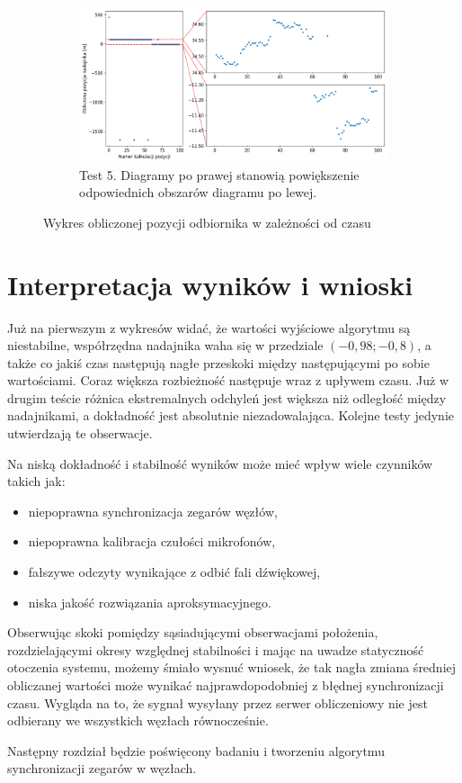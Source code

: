\begin{figure}[H]
    \ContinuedFloat\centering
    \begin{subfigure}{\textwidth}\label{fig:position_4}
        \centering
        \includegraphics[width=0.95\linewidth]{pics/position/position_4.png}
        \caption{Test 5. Diagramy po prawej stanowią powiększenie odpowiednich obszarów diagramu po lewej.}
    \end{subfigure}
    \caption{Wykres obliczonej pozycji odbiornika w zależności od czasu}
    \label{fig:position}
\end{figure}

\section{Interpretacja wyników i wnioski}

Już na pierwszym z wykresów widać, że wartości wyjściowe algorytmu są niestabilne, współrzędna nadajnika waha się w przedziale $(-0,98; -0,8)$, a także co jakiś czas następują nagłe przeskoki między następującymi po sobie wartościami. Coraz większa rozbieżność następuje wraz z upływem czasu. Już w drugim teście różnica ekstremalnych odchyleń jest większa niż odległość między nadajnikami, a dokładność jest absolutnie niezadowalająca. Kolejne testy jedynie utwierdzają te obserwacje.

Na niską dokładność i stabilność wyników może mieć wpływ wiele czynników takich jak:

\begin{itemize}
    \item niepoprawna synchronizacja zegarów węzłów,
    \item niepoprawna kalibracja czułości mikrofonów,
    \item fałszywe odczyty wynikające z odbić fali dźwiękowej,
    \item niska jakość rozwiązania aproksymacyjnego.
\end{itemize}

Obserwując skoki pomiędzy sąsiadującymi obserwacjami położenia, rozdzielającymi okresy względnej stabilności i mając na uwadze statyczność otoczenia systemu, możemy śmiało wysnuć wniosek, że tak nagła zmiana średniej obliczanej wartości może wynikać najprawdopodobniej z błędnej synchronizacji czasu. Wygląda na to, że sygnał wysyłany przez serwer obliczeniowy nie jest odbierany we wszystkich węzłach równocześnie. 

Następny rozdział będzie poświęcony badaniu i tworzeniu algorytmu synchronizacji zegarów w węzłach.